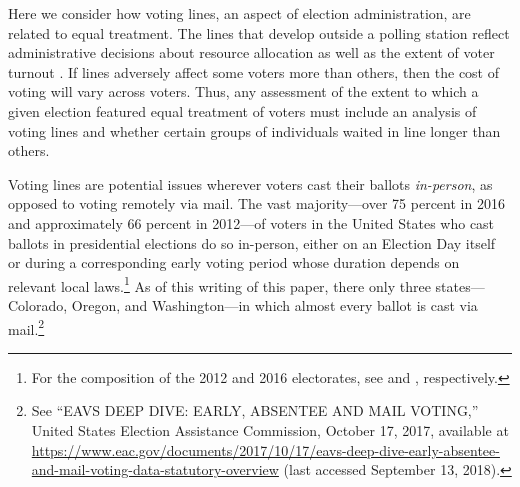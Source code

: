 \documentclass[12pt,titlepage]{article}
\begin{document}

Here we consider how voting lines, an aspect of election
administration, are related to equal treatment.  The lines that
develop outside a polling station reflect administrative decisions
about resource allocation as well as the extent of voter turnout
\citep{herronsmith:hanoverstudy}.  If lines adversely affect some
voters more than others, then the cost of voting will vary across
voters.  Thus, any assessment of the extent to which a given election
featured equal treatment of voters must include an analysis of voting
lines and whether certain groups of individuals waited in line longer
than others.

Voting lines are potential issues wherever voters cast their ballots
\emph{in-person}, as opposed to voting remotely via mail.  The vast
majority---over 75 percent in 2016 and approximately 66 percent in
2012---of voters in the United States who cast ballots in presidential
elections do so in-person, either on an Election Day itself or during
a corresponding early voting period whose duration depends on relevant
local laws.\footnote{For the composition of the 2012 and 2016
  electorates, see \citet{eac:2012} and \citet{eac:2016},
  respectively.}  As of this writing of this paper, there only three
states---Colorado, Oregon, and Washington---in which almost every
ballot is cast via mail.\footnote{See ``EAVS DEEP DIVE: EARLY,
  ABSENTEE AND MAIL VOTING,'' United States Election Assistance
  Commission, October 17, 2017, available at
  \url{https://www.eac.gov/documents/2017/10/17/eavs-deep-dive-early-absentee-and-mail-voting-data-statutory-overview}
  (last accessed September 13, 2018).}


\end{document}
